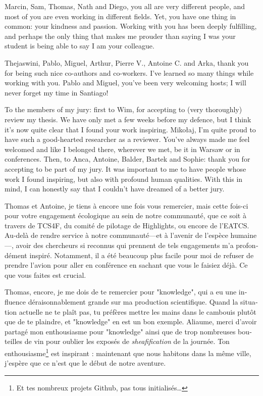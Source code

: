 Marcin, Sam, Thomas, Nath and Diego, you all are very different people, and
most of you are even working in different fields.
Yet, you have one thing in common: your kindness and passion. Working with
you has been deeply fulfilling, and perhaps the only thing that makes me
prouder than saying I was your student is being able to say I am your colleague.

Thejaswini, Pablo, Miguel, Arthur, Pierre V., Antoine C. and Arka, thank you for being such nice co-authors and co-workers. I've learned so many things while working with you. Pablo and Miguel, you've been very welcoming hosts; I will never forget my time in Santiago!

To the members of my jury: first to Wim, for accepting to (very thoroughly)
review my thesis. We have only met a few weeks before my defence, but I think it's now quite clear that 
I found your work inspiring.
Mikołaj, I'm quite proud to have such a good-hearted researcher as a reviewer. You've always made me feel welcomed and like I belonged there, wherever we met, be it in Warsaw or in conferences.
Then, to Anca, Antoine, Balder, Bartek and Sophie: thank you for accepting to be part of my jury.
It was important to me to have people whose work I found inspiring, but also with profound human 
qualities. With this in mind, I can honestly say that I couldn't have dreamed of a better jury.

\begin{french}
Thomas et Antoine, je tiens à encore une fois vous remercier, mais cette fois-ci pour votre 
engagement écologique au sein de notre communauté, que ce soit à travers de TCS4F, du comité de 
pilotage de Highlights, ou encore de l'EATCS. Au-delà de rendre service à notre communauté---et à 
l'avenir de l'espèce humaine---, avoir des chercheurs si reconnus qui prennent de tels 
engagements m'a profondément inspiré. Notamment, il a été beaucoup plus facile pour moi de refuser 
de prendre l'avion pour aller en conférence en sachant que vous le faisiez déjà.
Ce que vous faites est crucial.

Thomas, encore, je me dois de te remercier pour "knowledge", qui a eu une influence 
déraisonnablement grande sur ma production scientifique. Quand la situation actuelle ne te plaît
pas, tu préfères mettre les mains dans le cambouis plutôt que de te plaindre, et "knowledge" en est un bon exemple. Aliaume, merci d'avoir partagé mon enthousiasme pour "knowledge" ainsi que de trop
nombreuses bouteilles de vin pour oublier les exposés de \emph{sheafification} de la journée.
Ton enthousiasme\footnote{Et tes nombreux projets Github, pas tous initialisés…} est inspirant : maintenant que nous habitons dans la même ville, j'espère que ce
n'est que le début de notre aventure.
\end{french}

